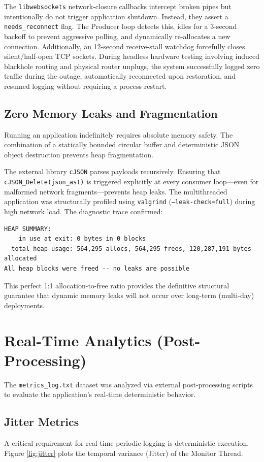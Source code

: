 \documentclass[12pt,a4paper]{article}
\begin{document}
The \texttt{libwebsockets} network-closure callbacks intercept broken pipes but intentionally do not trigger application shutdown. Instead, they assert a \texttt{needs\_reconnect} flag. The Producer loop detects this, idles for a 3-second backoff to prevent aggressive polling, and dynamically re-allocates a new connection. Additionally, an 12-second receive-stall watchdog forcefully closes silent/half-open TCP sockets. During headless hardware testing involving induced blackhole routing and physical router unplugs, the system successfully logged zero traffic during the outage, automatically reconnected upon restoration, and resumed logging without requiring a process restart.

\subsection{Zero Memory Leaks and Fragmentation}
Running an application indefinitely requires absolute memory safety. The combination of a statically bounded circular buffer and deterministic JSON object destruction prevents heap fragmentation. 

The external library \texttt{cJSON} parses payloads recursively. Ensuring that \texttt{cJSON\_Delete(json\_ast)} is triggered explicitly at every consumer loop—even for malformed network fragments—prevents heap leaks. The multithreaded application was structurally profiled using \texttt{valgrind} (\texttt{--leak-check=full}) during high network load. The diagnostic trace confirmed:
\begin{verbatim}
HEAP SUMMARY:
    in use at exit: 0 bytes in 0 blocks
  total heap usage: 564,295 allocs, 564,295 frees, 120,287,191 bytes allocated
All heap blocks were freed -- no leaks are possible
\end{verbatim}
This perfect 1:1 allocation-to-free ratio provides the definitive structural guarantee that dynamic memory leaks will not occur over long-term (multi-day) deployments.

\section{Real-Time Analytics (Post-Processing)}
The \texttt{metrics\_log.txt} dataset was analyzed via external post-processing scripts to evaluate the application's real-time deterministic behavior.

\subsection{Jitter Metrics}
A critical requirement for real-time periodic logging is deterministic execution. Figure \ref{fig:jitter} plots the temporal variance (Jitter) of the Monitor Thread.
\end{document}
